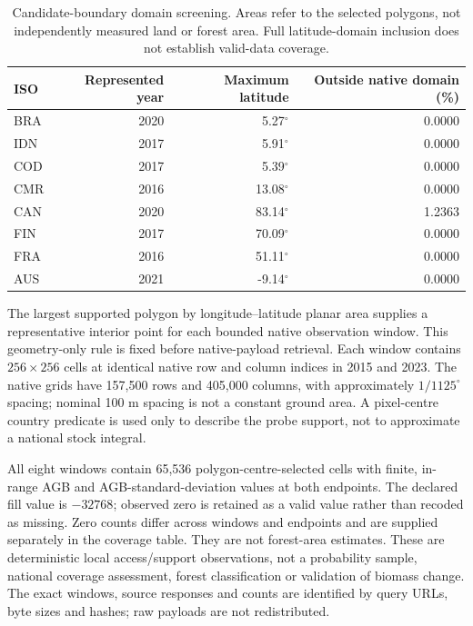 \documentclass[11pt,a4paper]{article}
\begin{document}
\begin{table}[htbp]
\centering\small
\caption{Candidate-boundary domain screening. Areas refer to the selected polygons, not independently measured land or forest area. Full latitude-domain inclusion does not establish valid-data coverage.}\label{tab:domain}
\begin{tabular}{lrrr}
\toprule
ISO & Represented year & Maximum latitude & Outside native domain (\%)\\\midrule
BRA & 2020 & 5.27$^\circ$ & 0.0000 \\
IDN & 2017 & 5.91$^\circ$ & 0.0000 \\
COD & 2017 & 5.39$^\circ$ & 0.0000 \\
CMR & 2016 & 13.08$^\circ$ & 0.0000 \\
CAN & 2020 & 83.14$^\circ$ & 1.2363 \\
FIN & 2017 & 70.09$^\circ$ & 0.0000 \\
FRA & 2016 & 51.11$^\circ$ & 0.0000 \\
AUS & 2021 & -9.14$^\circ$ & 0.0000 \\
\bottomrule
\end{tabular}
\end{table}

The largest supported polygon by longitude--latitude planar area supplies a representative interior point for each bounded native observation window. This geometry-only rule is fixed before native-payload retrieval. Each window contains $256\times256$ cells at identical native row and column indices in 2015 and 2023. The native grids have 157,500 rows and 405,000 columns, with approximately $1/1125^\circ$ spacing; nominal 100 m spacing is not a constant ground area. A pixel-centre country predicate is used only to describe the probe support, not to approximate a national stock integral.

All eight windows contain 65,536 polygon-centre-selected cells with finite, in-range AGB and AGB-standard-deviation values at both endpoints. The declared fill value is $-32768$; observed zero is retained as a valid value rather than recoded as missing. Zero counts differ across windows and endpoints and are supplied separately in the coverage table. They are not forest-area estimates. These are deterministic local access/support observations, not a probability sample, national coverage assessment, forest classification or validation of biomass change. The exact windows, source responses and counts are identified by query URLs, byte sizes and hashes; raw payloads are not redistributed.
\end{document}

